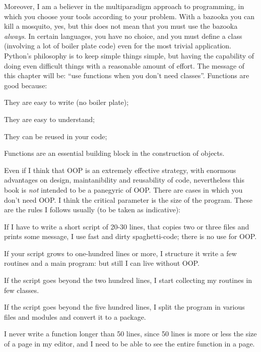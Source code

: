 \documentclass[10pt,english]{article}
\begin{document}
Moreover, I am a believer in the multiparadigm approach to programming, 
in which you choose your tools according to your problem. 
With a  bazooka you can kill a mosquito, yes, but this does not mean 
that you must use the bazooka \emph{always}. 
In certain languages, you have no choice, and you must define
a class (involving a lot of boiler plate code) even for the most trivial
application. Python's philosophy is to keep simple things simple, but
having the capability of doing even difficult things with a reasonable
amount of effort. The message of this chapter will be: ``use functions when 
you don't need classes''. Functions are good because:
\begin{list}{.}
{
\setlength{\rightmargin}{\leftmargin}
}
\item {} 
They are easy to write (no boiler plate);

\item {} 
They are easy to understand;

\item {} 
They can be reused in your code;

\item {} 
Functions are an essential building block in the construction of objects.

\end{list}

Even if I think that OOP is an extremely effective strategy, with
enormous advantages on design, maintanibility and reusability of code,
nevertheless this book is \emph{not} intended to be a panegyric of OOP. There
are cases in which you don't need OOP. I think the critical parameter is
the size of the program. These are the rules I follows usually (to be
taken as indicative):
\begin{list}{.}
{
\setlength{\rightmargin}{\leftmargin}
}
\item {} 
If I have to write a short script of 20-30 lines, that copies two or 
three files and prints some message, I use fast and dirty spaghetti-code; 
there is no use for OOP.

\item {} 
If your script grows to one-hundred lines or more, I structure
it  write a few routines and a main program: but still I can live
without OOP.

\item {} 
If the script goes beyond the two hundred lines, I start
collecting my routines in few classes.

\item {} 
If the script goes beyond the five hundred lines, I split the program
in various files and modules and convert it to a package.

\item {} 
I never write a function longer than 50 lines, since 50 lines is more
or less the size of a page in my editor, and I need to be able to
see the entire function in a page.

\end{list}
\end{document}
